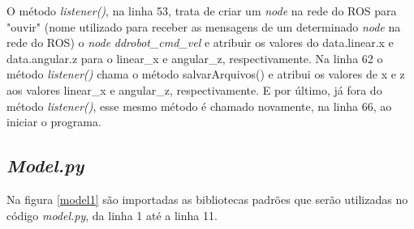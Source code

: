 O método \textit{listener()}, na linha 53, trata de criar um \textit{node} na rede do ROS para "ouvir" (nome utilizado para receber as mensagens de um determinado \textit{node} na rede do ROS) o \textit{node} \textit{ddrobot\_cmd\_vel} e atribuir os valores do data.linear.x e data.angular.z para o linear\_x e angular\_z, respectivamente.
Na linha 62 o método \textit{listener()} chama o método salvarArquivos() e atribui os valores de x e z aos valores linear\_x e angular\_z, respectivamente. E por último, já fora do método \textit{listener()}, esse mesmo método é chamado novamente, na linha 66, ao iniciar o programa.

\subsection{\textit{Model.py}}
\label{codigo_model}

	\begin{figure}[H]
		\centering
\end{figure}

Na figura \ref{model1} são importadas as bibliotecas padrões que serão utilizadas no código \textit{model.py}, da linha 1 até a linha 11.

	\begin{figure}[H]
		\centering
\end{figure}

